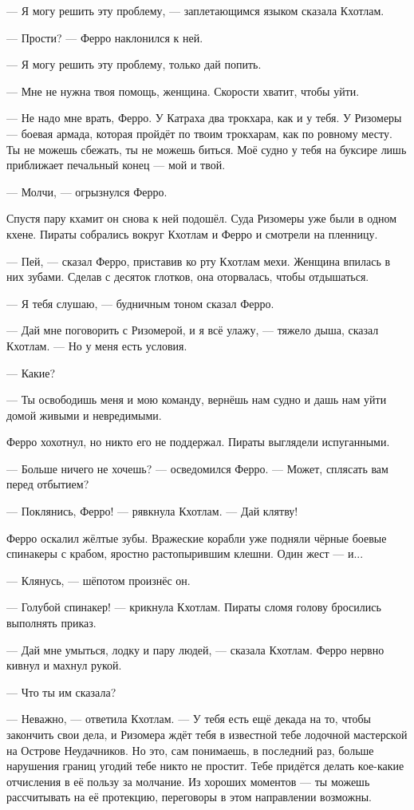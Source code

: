 --- Я могу решить эту проблему, --- заплетающимся языком сказала Кхотлам.

--- Прости? --- Ферро наклонился к ней.

--- Я могу решить эту проблему, только дай попить.

--- Мне не нужна твоя помощь, женщина.
Скорости хватит, чтобы уйти.

--- Не надо мне врать, Ферро.
У Катраха два трокхара, как и у тебя.
У Ризомеры --- боевая армада, которая пройдёт по твоим трокхарам, как по ровному месту.
Ты не можешь сбежать, ты не можешь биться.
Моё судно у тебя на буксире лишь приближает печальный конец --- мой и твой.

--- Молчи, --- огрызнулся Ферро.

Спустя пару кхамит он снова к ней подошёл.
Суда Ризомеры уже были в одном кхене.
Пираты собрались вокруг Кхотлам и Ферро и смотрели на пленницу.

--- Пей, --- сказал Ферро, приставив ко рту Кхотлам мехи.
Женщина впилась в них зубами.
Сделав с десяток глотков, она оторвалась, чтобы отдышаться.

--- Я тебя слушаю, --- будничным тоном сказал Ферро.

--- Дай мне поговорить с Ризомерой, и я всё улажу, --- тяжело дыша, сказал Кхотлам.
--- Но у меня есть условия.

--- Какие?

--- Ты освободишь меня и мою команду, вернёшь нам судно и дашь нам уйти домой живыми и невредимыми.

Ферро хохотнул, но никто его не поддержал.
Пираты выглядели испуганными.

--- Больше ничего не хочешь? --- осведомился Ферро.
--- Может, сплясать вам перед отбытием?

--- Поклянись, Ферро! --- рявкнула Кхотлам.
--- Дай клятву!

Ферро оскалил жёлтые зубы.
Вражеские корабли уже подняли чёрные боевые спинакеры с крабом, яростно растопырившим клешни.
Один жест --- и...

--- Клянусь, --- шёпотом произнёс он.

--- Голубой спинакер! --- крикнула Кхотлам.
Пираты сломя голову бросились выполнять приказ.

--- Дай мне умыться, лодку и пару людей, --- сказала Кхотлам.
Ферро нервно кивнул и махнул рукой.

\asterism

--- Что ты им сказала?

--- Неважно, --- ответила Кхотлам.
--- У тебя есть ещё декада на то, чтобы закончить свои дела, и Ризомера ждёт тебя в известной тебе лодочной мастерской на Острове Неудачников.
Но это, сам понимаешь, в последний раз, больше нарушения границ угодий тебе никто не простит.
Тебе придётся делать кое-какие отчисления в её пользу за молчание.
Из хороших моментов --- ты можешь рассчитывать на её протекцию, переговоры в этом направлении возможны.

